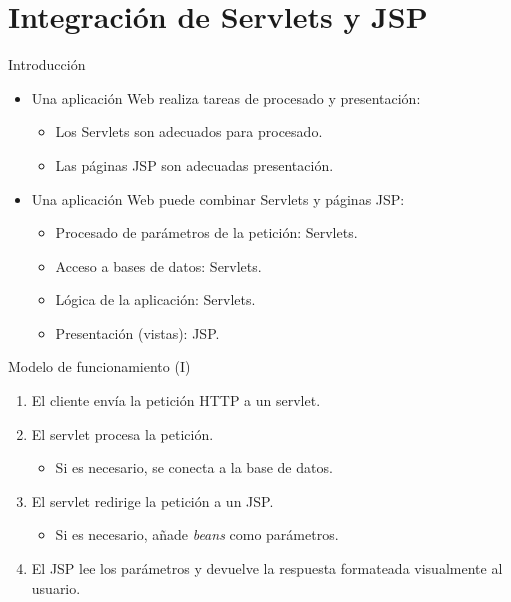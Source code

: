 
\part{Integración de Servlets y JSP}


\begin{slide}{Introducción}
  \begin{itemize}
  \item Una aplicación Web realiza tareas de procesado y presentación:
    \begin{itemize}
    \item Los Servlets son adecuados para procesado.
    \item Las páginas JSP son adecuadas presentación.
    \end{itemize}
  \item Una aplicación Web puede combinar Servlets y páginas JSP:
    \begin{itemize}
    \item Procesado de parámetros de la petición: Servlets.
    \item Acceso a bases de datos: Servlets.
    \item Lógica de la aplicación: Servlets.
    \item Presentación (vistas): JSP.
    \end{itemize}
  \end{itemize}
\end{slide}

\begin{slide}{Modelo de funcionamiento (I)}
  \begin{enumerate}
  \item El cliente envía la petición HTTP a un servlet.
  \item El servlet procesa la petición.
    \begin{itemize}
    \item Si es necesario, se conecta a la base de datos.
    \end{itemize}
  \item El servlet redirige la petición a un JSP.
    \begin{itemize}
    \item Si es necesario, añade \emph{beans} como parámetros.
    \end{itemize}
  \item El JSP lee los parámetros y devuelve la respuesta 
    formateada visualmente al usuario.
  \end{enumerate}
\end{slide}

